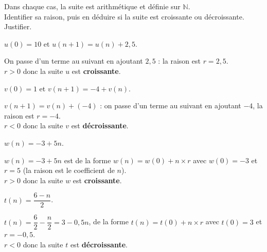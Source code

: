 \documentclass[11pt,a4paper]{article}  %
\begin{document}
\exerciceDS{}
Dans chaque cas, la suite est arithmétique et définie sur $\mathbb{N}$.\\
Identifier sa raison, puis en déduire si la suite est croissante ou décroissante. Justifier.
\begin{enumMet}
	\item $u(0)=10$ et $u(n+1)=u(n)+2,5$.
	\par
	\begin{corrBox}
		On passe d'un terme au suivant en ajoutant $2,5$ : la raison est $r=2,5$.\\
		$r>0$ donc la suite $u$ est \textbf{croissante}.
	\end{corrBox}

	\item $v(0)=1$ et $v(n+1)=-4+v(n)$.
	\par
	\begin{corrBox}
		$v(n+1)=v(n)+(-4)$ : on passe d'un terme au suivant en ajoutant $-4$, la raison est $r=-4$.\\
		$r<0$ donc la suite $v$ est \textbf{décroissante}.
	\end{corrBox}

	\item $w(n)=-3+5n$.
	\par
	\begin{corrBox}
		$w(n)=-3+5n$ est de la forme $w(n)=w(0)+n\times r$ avec $w(0)=-3$ et $r=5$ (la raison est le coefficient de $n$).\\
		$r>0$ donc la suite $w$ est \textbf{croissante}.
	\end{corrBox}

	\item {} $t(n)=\dfrac{6-n}{2}$.
	\par
	\begin{corrBox}
		$t(n)=\dfrac{6}{2}-\dfrac{n}{2}=3-0,5n$, de la forme $t(n)=t(0)+n\times r$ avec $t(0)=3$ et $r=-0,5$.\\
		$r<0$ donc la suite $t$ est \textbf{décroissante}.
	\end{corrBox}
\end{enumMet}
\end{document}
